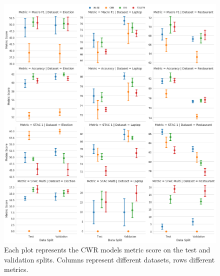 \begin{figure}[!h]
    \centering
    \includegraphics[scale=0.4]{images/augmentation/methods_performance/CWR/overall_cwr_results.png}
    \caption{Each plot represents the CWR models metric score on the test and validation splits. Columns represent different datasets, rows different metrics.}
    \label{fig:aug_overall_cwr_results}
\end{figure}

